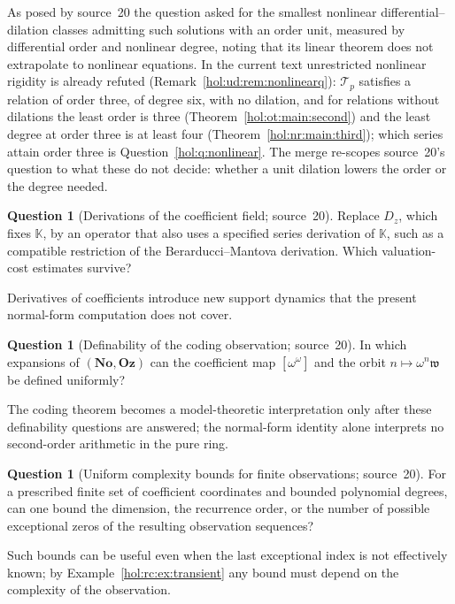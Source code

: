 \documentclass[11pt]{article}
\numberwithin{equation}{section}
\theoremstyle{definition}
\newtheorem{question}[theorem]{Question}
\theoremstyle{remark}
\newcommand{\No}{\mathbf{No}}
\newcommand{\KK}{\mathbb K}
\newcommand{\Oz}{\mathbf{Oz}}
\begin{document}
As posed by source~20 the question asked for the smallest nonlinear
differential--dilation classes admitting such solutions with an order unit,
measured by differential order and nonlinear degree, noting that its linear
theorem does not extrapolate to nonlinear equations. In the current text
unrestricted nonlinear rigidity is already refuted
(Remark~\ref{hol:ud:rem:nonlinearq}): $\mathcal T_p$ satisfies a relation of
order three, of degree six, with no dilation, and for relations without
dilations the least order is three (Theorem~\ref{hol:ot:main:second}) and the
least degree at order three is at least four (Theorem~\ref{hol:nr:main:third});
which series attain order three is Question~\ref{hol:q:nonlinear}. The merge
re-scopes source~20's question to what these do not decide: whether a unit
dilation lowers the order or the degree needed.

\begin{question}[Derivations of the coefficient field; source~20]
\label{hol:rc:q:derivations}
Replace $D_z$, which fixes $\KK$, by an operator that also uses a specified
series derivation of $\KK$, such as a compatible restriction of the
Berarducci--Mantova derivation. Which valuation-cost estimates survive?
\end{question}

Derivatives of coefficients introduce new support dynamics that the present
normal-form computation does not cover.

\begin{question}[Definability of the coding observation; source~20]
\label{hol:rc:q:definability}
In which expansions of $(\No,\Oz)$ can the coefficient map $[\omega^\omega]$
and the orbit $n\mapsto\omega^n\mathfrak w$ be defined uniformly?
\end{question}

The coding theorem becomes a model-theoretic interpretation only after these
definability questions are answered; the normal-form identity alone
interprets no second-order arithmetic in the pure ring.

\begin{question}[Uniform complexity bounds for finite observations;
source~20]\label{hol:rc:q:complexity}
For a prescribed finite set of coefficient coordinates and bounded polynomial
degrees, can one bound the dimension, the recurrence order, or the number of
possible exceptional zeros of the resulting observation sequences?
\end{question}

Such bounds can be useful even when the last exceptional index is not
effectively known; by Example~\ref{hol:rc:ex:transient} any bound must depend
on the complexity of the observation.
\end{document}
